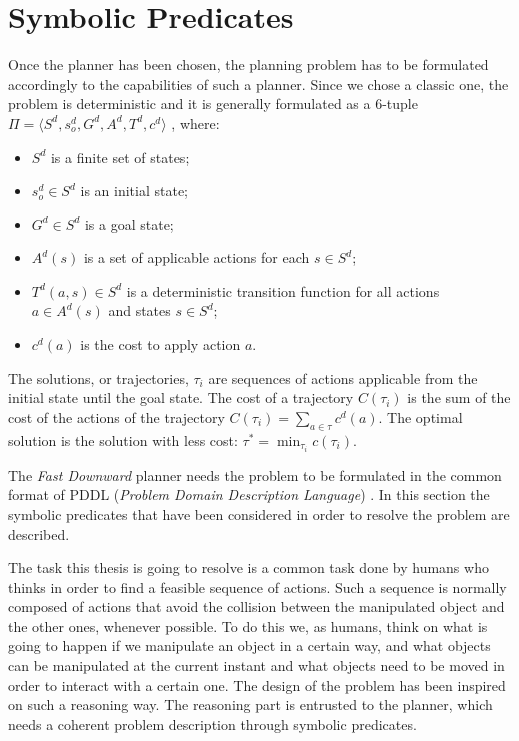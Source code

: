 \section{Symbolic Predicates}
Once the planner has been chosen, the planning problem has to be formulated accordingly to the capabilities of such a planner. Since we chose a classic one, the problem is deterministic and it is generally formulated as a $6$-tuple $\Pi=\langle S^d, s_o^d, G^d, A^d, T^d, c^d \rangle$ \cite{little2007probabilistic}, where:
\begin{itemize}
\item $S^d$ is a finite set of states;
\item $s_o^d \in S^d$ is an initial state;
\item $G^d \in S^d$ is a goal state;
\item $A^d(s)$ is a set of applicable actions for each $s \in S^d$;
\item $T^d(a,s) \in S^d$ is a deterministic transition function for all actions $a \in A^d(s)$ and states $ s \in S^d$;
\item $c^d(a)$ is the cost to apply action $a$. 
\end{itemize}
The solutions, or trajectories, $\tau_i$ are sequences of actions applicable from the initial state until the goal state. The cost of a trajectory $C(\tau_i)$ is the sum of the cost of the actions of the trajectory $C(\tau_i) = \sum_{a \in \tau} c^d(a)$. The optimal solution is the solution with less cost: $\tau^* = \min_{\tau_i} c(\tau_i)$.


The \textit{Fast Downward} planner needs the problem to be formulated in the common format of PDDL (\textit{Problem Domain Description Language}) \citep{pddl}. In this section the symbolic predicates that have been considered in order to resolve the problem are described.

The task this thesis is going to resolve is a common task done by humans who thinks in order to find a feasible sequence of actions. Such a sequence is normally composed of actions that avoid the collision between the manipulated object and the other ones, whenever possible. To do this we, as humans, think on what is going to happen if we manipulate an object in a certain way, and what objects can be manipulated at the current instant and what objects need to be moved in order to interact with a certain one. The design of the problem has been inspired on such a reasoning way. The reasoning part is entrusted to the planner, which needs a coherent problem description through symbolic predicates. 

